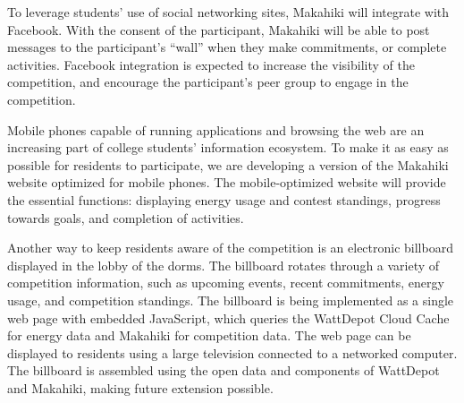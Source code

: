 To leverage students' use of social networking sites, Makahiki will
integrate with Facebook. With the consent of the participant, Makahiki will be
able to post messages to the participant's ``wall'' when they make commitments,
or complete activities. Facebook integration is expected to increase the
visibility of the competition, and encourage the participant's peer group to
engage in the competition.

Mobile phones capable of running applications and browsing the web are an
increasing part of college students' information ecosystem. To make it as easy
as possible for residents to participate, we are developing a version of the
Makahiki website optimized for mobile phones. The mobile-optimized website will
provide the essential functions: displaying energy usage and contest standings,
progress towards goals, and completion of activities.

Another way to keep residents aware of the competition is an electronic
billboard displayed in the lobby of the dorms. The billboard rotates through a
variety of competition information, such as upcoming events, recent commitments,
energy usage, and competition standings. The billboard is being implemented as
a single web page with embedded JavaScript, which queries the WattDepot Cloud
Cache for energy data and Makahiki for competition data. The web page can be
displayed to residents using a large television connected to a networked
computer. The billboard is assembled using the open data and components of
WattDepot and Makahiki, making future extension possible.